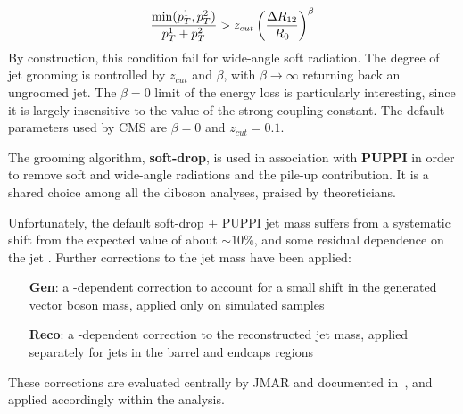 \begin{itemize}
 $$\frac{\min(p_T^1,p_T^2)}{p_T^1+p_T^2} > z_{cut} \left( \frac{\Delta R_{12}}{R_0} \right)^\beta$$
By construction, this condition fail for wide-angle soft radiation. The degree of jet grooming is controlled by $z_{cut}$ and $\beta$, with $\beta \to \infty$ returning back an ungroomed jet.  The $\beta=0$ limit of the energy loss is particularly interesting, since it is largely insensitive to the value of the strong coupling constant. The default parameters used by CMS are $\beta=0$ and $z_{cut}=0.1$.
\end{itemize}


The grooming algorithm, {\bf soft-drop}, is used in association with {\bf PUPPI} in order to remove soft and wide-angle radiations and the pile-up contribution. It is a shared choice among all the diboson analyses, praised by theoreticians.

Unfortunately, the default soft-drop + PUPPI jet mass suffers from a systematic shift from the expected value of about $\sim 10\%$, and some residual dependence on the jet \pt. Further corrections to the jet mass have been applied:

\begin{enumerate}
  \item[{\bf Gen}:] a \pt-dependent correction to account for a small shift in the generated vector boson mass, applied only on simulated samples
  \item[{\bf Reco}:] a \pt-dependent correction to the reconstructed jet mass, applied separately for jets in the barrel and endcaps regions
\end{enumerate}

These corrections are evaluated centrally by JMAR and documented in~\cite{AN-16-215}, and applied accordingly within the analysis.

